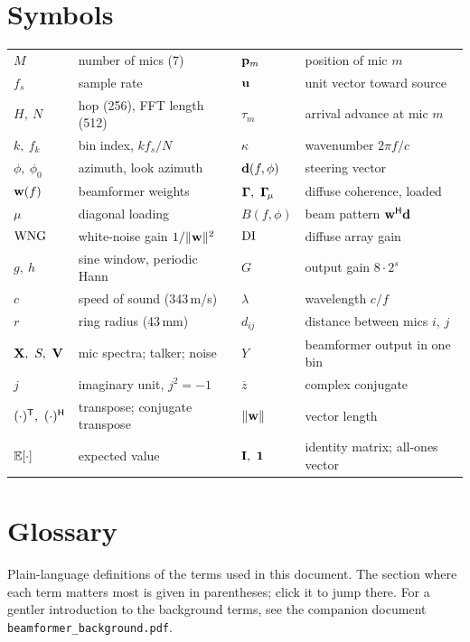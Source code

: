 \documentclass[11pt]{article}
\begin{document}
\section{Symbols}\label{app:symbols}
\begin{center}\small
\begin{tabular}{@{}ll@{\qquad}ll@{}}
\toprule
$M$ & number of mics (7) & $\mathbf{p}_m$ & position of mic $m$\\
$f_s$ & sample rate & $\mathbf{u}$ & unit vector toward source\\
$H,\ N$ & hop (256), FFT length (512) & $\tau_m$ & arrival advance at mic $m$\\
$k,\ f_k$ & bin index, $k f_s/N$ & $\kappa$ & wavenumber $2\pi f/c$\\
$\phi,\ \phi_0$ & azimuth, look azimuth & $\mathbf{d}(f,\phi)$ & steering vector\\
$\mathbf{w}(f)$ & beamformer weights & $\G,\ \Gmu$ & diffuse coherence, loaded\\
$\mu$ & diagonal loading & $B(f,\phi)$ & beam pattern $\mathbf{w}^{\mathsf H}\mathbf{d}$\\
$\mathrm{WNG}$ & white-noise gain $1/\|\mathbf{w}\|^2$ & $\mathrm{DI}$ & diffuse array gain\\
$g,\ h$ & sine window, periodic Hann & $G$ & output gain $8\cdot2^s$\\
$c$ & speed of sound (343\,m/s) & $\lambda$ & wavelength $c/f$\\
$r$ & ring radius (43\,mm) & $d_{ij}$ & distance between mics $i$, $j$\\
$\vx,\ S,\ \vn$ & mic spectra; talker; noise & $Y$ & beamformer output in one bin\\
$j$ & imaginary unit, $j^2=-1$ & $\overline{z}$ & complex conjugate\\
$(\cdot)\tr,\ (\cdot)\herm$ & transpose; conjugate transpose & $\|\mathbf{w}\|$ & vector length\\
$\mathbb{E}[\cdot]$ & expected value & $\mI,\ \one$ & identity matrix; all-ones vector\\
\bottomrule
\end{tabular}
\end{center}

\section{Glossary}\label{app:glossary}
Plain-language definitions of the terms used in this document. The section where each term
matters most is given in parentheses; click it to jump there. For a gentler introduction to the background terms, see the
companion document \texttt{beamformer\_background.pdf}.


\end{document}
